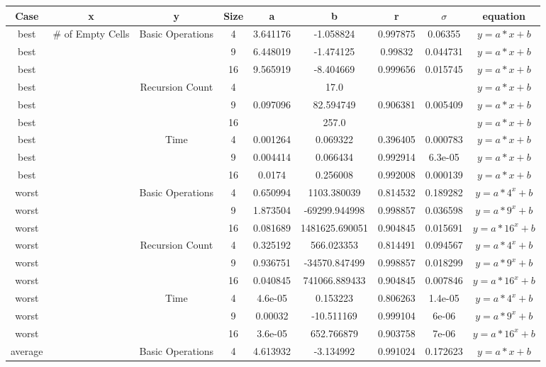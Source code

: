 
\begin{tabular}{ |c|c|c|c|c|c|c|c|c| } 
Case & x & y & Size & a & b & r & $\sigma$ & equation \\
\hline
best & \# of Empty Cells & Basic Operations & 4 & 3.641176 & -1.058824 & 0.997875 & 0.06355 & $y = a * x + b$ \\
best &  &  & 9 & 6.448019 & -1.474125 & 0.99832 & 0.044731 & $y = a * x + b$ \\
best &  &  & 16 & 9.565919 & -8.404669 & 0.999656 & 0.015745 & $y = a * x + b$ \\
\hline
best &  & Recursion Count & 4 &  & 17.0 &  &  & $y = a * x + b$ \\
best &  &  & 9 & 0.097096 & 82.594749 & 0.906381 & 0.005409 & $y = a * x + b$ \\
best &  &  & 16 &  & 257.0 &  &  & $y = a * x + b$ \\
\hline
best &  & Time & 4 & 0.001264 & 0.069322 & 0.396405 & 0.000783 & $y = a * x + b$ \\
best &  &  & 9 & 0.004414 & 0.066434 & 0.992914 & 6.3e-05 & $y = a * x + b$ \\
best &  &  & 16 & 0.0174 & 0.256008 & 0.992008 & 0.000139 & $y = a * x + b$ \\
\hline
worst &  & Basic Operations & 4 & 0.650994 & 1103.380039 & 0.814532 & 0.189282 & $ y = a * 4^x + b$ \\
worst &  &  & 9 & 1.873504 & -69299.944998 & 0.998857 & 0.036598 & $ y = a * 9^x + b$ \\
worst &  &  & 16 & 0.081689 & 1481625.690051 & 0.904845 & 0.015691 & $ y = a * 16^x + b$ \\
\hline
worst &  & Recursion Count & 4 & 0.325192 & 566.023353 & 0.814491 & 0.094567 & $ y = a * 4^x + b$ \\
worst &  &  & 9 & 0.936751 & -34570.847499 & 0.998857 & 0.018299 & $ y = a * 9^x + b$ \\
worst &  &  & 16 & 0.040845 & 741066.889433 & 0.904845 & 0.007846 & $ y = a * 16^x + b$ \\
\hline
worst &  & Time & 4 & 4.6e-05 & 0.153223 & 0.806263 & 1.4e-05 & $ y = a * 4^x + b$ \\
worst &  &  & 9 & 0.00032 & -10.511169 & 0.999104 & 6e-06 & $ y = a * 9^x + b$ \\
worst &  &  & 16 & 3.6e-05 & 652.766879 & 0.903758 & 7e-06 & $ y = a * 16^x + b$ \\
\hline
average &  & Basic Operations & 4 & 4.613932 & -3.134992 & 0.991024 & 0.172623 & $ y = a * x + b$ \\

\end{tabular}
